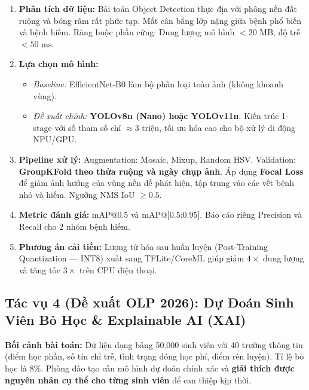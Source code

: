 \documentclass[10pt,a4paper]{article}
\begin{document}
\begin{enumerate}[leftmargin=*]
    \item \textbf{Phân tích dữ liệu:} Bài toán Object Detection thực địa với phông nền đất ruộng và bóng râm rất phức tạp. Mất cân bằng lớp nặng giữa bệnh phổ biến và bệnh hiếm. Ràng buộc phần cứng: Dung lượng mô hình $< 20\text{ MB}$, độ trễ $< 50\text{ ms}$.
    \item \textbf{Lựa chọn mô hình:}
    \begin{itemize}
        \item \textit{Baseline:} EfficientNet-B0 làm bộ phân loại toàn ảnh (không khoanh vùng).
        \item \textit{Đề xuất chính:} \textbf{YOLOv8n (Nano) hoặc YOLOv11n}. Kiến trúc 1-stage với số tham số chỉ $\approx 3\text{ triệu}$, tối ưu hóa cao cho bộ xử lý di động NPU/GPU.
    \end{itemize}
    \item \textbf{Pipeline xử lý:} Augmentation: Mosaic, Mixup, Random HSV. Validation: \textbf{GroupKFold theo thửa ruộng và ngày chụp ảnh}. Áp dụng \textbf{Focal Loss} để giảm ảnh hưởng của vùng nền dễ phát hiện, tập trung vào các vết bệnh nhỏ và hiếm. Ngưỡng NMS IoU $\ge 0.5$.
    \item \textbf{Metric đánh giá:} $\text{mAP@0.5}$ và $\text{mAP@[0.5:0.95]}$. Báo cáo riêng Precision và Recall cho 2 nhóm bệnh hiếm.
    \item \textbf{Phương án cải tiến:} Lượng tử hóa sau huấn luyện (Post-Training Quantization --- INT8) xuất sang TFLite/CoreML giúp giảm $4\times$ dung lượng và tăng tốc $3\times$ trên CPU điện thoại.
\end{enumerate}

\subsection{Tác vụ 4 (Đề xuất OLP 2026): Dự Đoán Sinh Viên Bỏ Học \& Explainable AI (XAI)}
\textbf{Bối cảnh bài toán:} Dữ liệu dạng bảng 50.000 sinh viên với 40 trường thông tin (điểm học phần, số tín chỉ trễ, tình trạng đóng học phí, điểm rèn luyện). Tỉ lệ bỏ học là $8\%$. Phòng đào tạo cần mô hình dự đoán chính xác và \textbf{giải thích được nguyên nhân cụ thể cho từng sinh viên} để can thiệp kịp thời.
\end{document}
